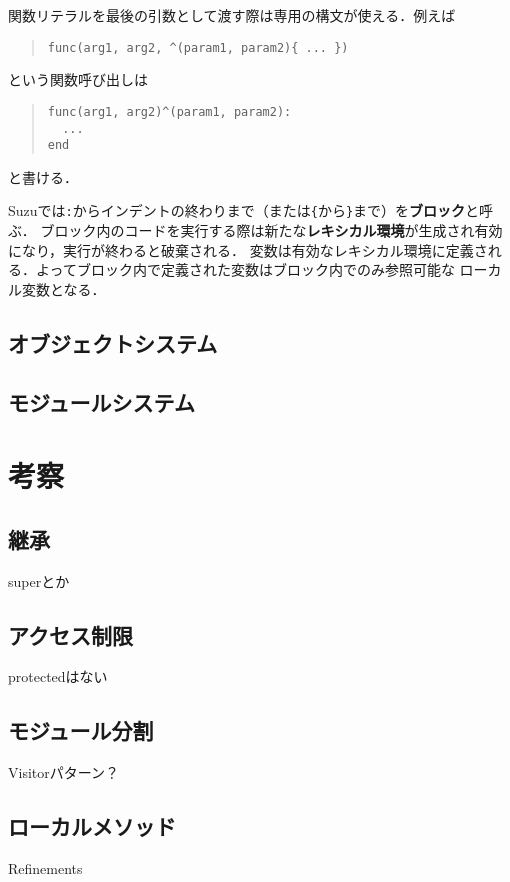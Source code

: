 \documentclass[a4paper,11pt,dvipdfmx]{jreport}
\begin{document}
関数リテラルを最後の引数として渡す際は専用の構文が使える．例えば
\begin{quote}
\begin{verbatim}
func(arg1, arg2, ^(param1, param2){ ... })
\end{verbatim}
\end{quote}
という関数呼び出しは
\begin{quote}
\begin{verbatim}
func(arg1, arg2)^(param1, param2):
  ...
end
\end{verbatim}
\end{quote}
と書ける．

Suzuでは\verb|:|からインデントの終わりまで（または\verb|{|から\verb|}|まで）を\textbf{ブロック}と呼ぶ．
ブロック内のコードを実行する際は新たな\textbf{レキシカル環境}が生成され有効になり，実行が終わると破棄される．
変数は有効なレキシカル環境に定義される．よってブロック内で定義された変数はブロック内でのみ参照可能な
ローカル変数となる．


\section{オブジェクトシステム}

\section{モジュールシステム}


\chapter{考察}
\label{chapter:discussion}

\section{継承}
superとか

\section{アクセス制限}
protectedはない

\section{モジュール分割}
Visitorパターン？

\section{ローカルメソッド}
Refinements
\end{document}
